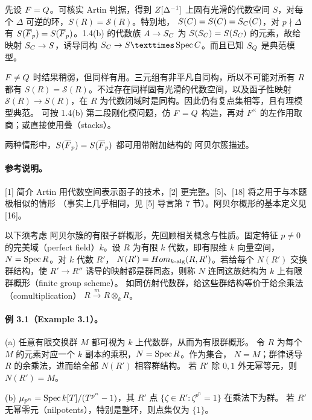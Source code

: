 先设 $F=Q$。可核实 Artin 判据，得到 $Z[\Delta^{-1}]$ 上固有光滑的代数空间
$S$，对每个 $\Delta$ 可逆的环，$S(R)=\mathcal S(R)$。特别地，
$S(C)=S(C)=S_C(C)$，对 $p\nmid\Delta$ 有
$S(\overline{F}_p)=S(\overline{F}_p)$。1.4(b) 的代数族
$A\to S_C$ 为 $S(S_C)=S(S_C)$ 的元素，故给映射
$S_C\to S$，诱导同构 $S_\C\to S\times\Spec\C$。而且已知 $S_Q$ 是典范模型。

$F\ne Q$ 时结果稍弱，但同样有用。三元组有非平凡自同构，所以不可能对所有
$R$ 都有 $S(R)=\mathcal S(R)$。不过存在同样固有光滑的代数空间，以及函子性映射
$\mathcal S(R)\to S(R)$，在 $R$ 为代数闭域时是同构。因此仍有复点集相等，且有理模型典范。
可按 1.4(b) 第二段刚化模问题，仿 $F=Q$ 构造，再对 $F^\times$ 的左作用取商；或直接使用叠（stacks）。

两种情形中，$S(\overline{F}_p)=S(\overline{F}_p)$ 都可用带附加结构的 阿贝尔簇描述。

\paragraph*{参考说明。}
[1] 简介 Artin 用代数空间表示函子的技术，[2] 更完整。[5]、[18] 将之用于与本题极相似的情形
（事实上几乎相同，见 [5] 导言第 7 节）。阿贝尔概形的基本定义见 [16]。

以下须考虑 阿贝尔簇的有限子群概形，先回顾相关概念与性质。固定特征
$p\ne0$ 的完美域（perfect field）$k$。设 $R$ 为有限 $k$ 代数，即有限维
$k$ 向量空间，$N=\operatorname{Spec} R$。对 $k$ 代数 $R'$，
$N(R')=Hom_{k\text{-alg}}(R,R')$。若给每个 $N(R')$ 交换群结构，使
$R'\to R''$ 诱导的映射都是群同态，则称 $N$ 连同这族结构为 $k$ 上有限群概形（finite group scheme）。
如同仿射代数群，给这些群结构等价于给余乘法（comultiplication）
$R\xrightarrow mR\otimes_kR$。

\paragraph*{例 3.1（Example 3.1）。}
(a) 任意有限交换群 $M$ 都可视为 $k$ 上代数群，从而为有限群概形。
令 $R$ 为每个 $M$ 的元素对应一个 $k$ 副本的乘积，$N=\operatorname{Spec} R$。作为集合，
$N=M$；群律诱导 $R$ 的余乘法，进而给全部 $N(R')$ 相容群结构。
若 $R'$ 除 $0,1$ 外无幂等元，则 $N(R')=M$。

(b) $\mu_{p^n}=\operatorname{Spec} k[T]/(T^{p^n}-1)$，其
$R'$ 点 $\{\zeta\in R':\zeta^{p^n}=1\}$ 在乘法下为群。
若 $R'$ 无幂零元（nilpotents），特别是整环，则点集仅为 $\{1\}$。

